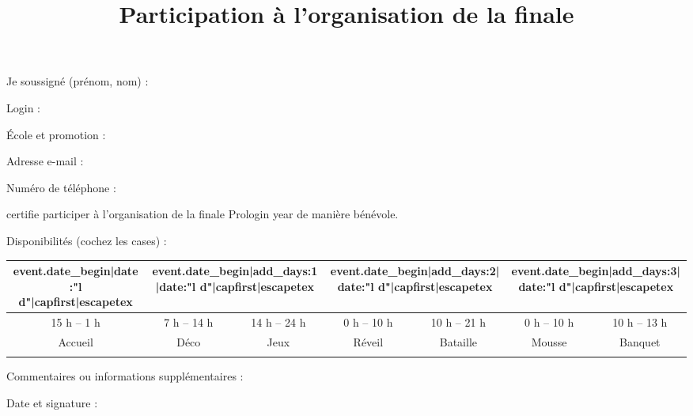 \documentclass[a4paper,11pt]{prologin}
\title{Participation à l'organisation de la finale}
\begin{document}
Je soussigné (prénom, nom) : \hrulefill

Login : \hrulefill

École et promotion : \hrulefill

Adresse e-mail : \hrulefill

Numéro de téléphone : \hrulefill

certifie participer à l'organisation de la finale Prologin {{ year }} de
manière bénévole.

Disponibilités (cochez les cases) :

\begin{center}
\begin{tabular}{|c|c|c|c|c|c|c|}
\hline

{{ event.date_begin|date:"l d"|capfirst|escapetex }} &
\multicolumn{2}{c|}{ {{ event.date_begin|add_days:1|date:"l d"|capfirst|escapetex }} } &
\multicolumn{2}{c|}{ {{ event.date_begin|add_days:2|date:"l d"|capfirst|escapetex }} } &
\multicolumn{2}{c|}{ {{ event.date_begin|add_days:3|date:"l d"|capfirst|escapetex }} }
\tabularnewline
\hline
15 h -- 1 h & 7 h -- 14 h & 14 h -- 24 h & 0 h -- 10 h & 10 h -- 21 h &
0 h -- 10 h & 10 h -- 13 h\tabularnewline
\hline
Accueil & Déco & Jeux & Réveil & Bataille & Mousse & Banquet\tabularnewline
\hline
&&&&&&\tabularnewline
\hline
\end{tabular}
\end{center}

Commentaires ou informations supplémentaires :

\vspace{5cm}

Date et signature :
\end{document}
